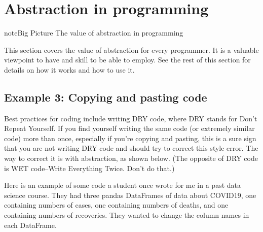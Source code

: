 \documentclass[letterpaper,10pt,english]{sphinxmanual}
\begin{document}
\section{Abstraction in programming}
\label{\detokenize{chapter-7-abstraction:abstraction-in-programming}}
\begin{sphinxadmonition}{note}{Big Picture \sphinxhyphen{} The value of abstraction in programming}

This section covers the value of abstraction for every programmer.  It is a valuable viewpoint to have and skill to be able to employ.  See the rest of this section for details on how it works and how to use it.
\end{sphinxadmonition}


\subsection{Example 3: Copying and pasting code}
\label{\detokenize{chapter-7-abstraction:example-3-copying-and-pasting-code}}
Best practices for coding include writing DRY code, where DRY stands for Don’t Repeat Yourself.  If you find yourself writing the same code (or extremely similar code) more than once, especially if you’re copying and pasting, this is a sure sign that you are not writing DRY code and should try to correct this style error.  The way to correct it is with abstraction, as shown below.  (The opposite of DRY code is WET code–Write Everything Twice.  Don’t do that.)

Here is an example of some code a student once wrote for me in a past data science course.  They had three pandas DataFrames of data about COVID\sphinxhyphen{}19, one containing numbers of cases, one containing numbers of deaths, and one containing numbers of recoveries.  They wanted to change the column names in each DataFrame.
\end{document}

